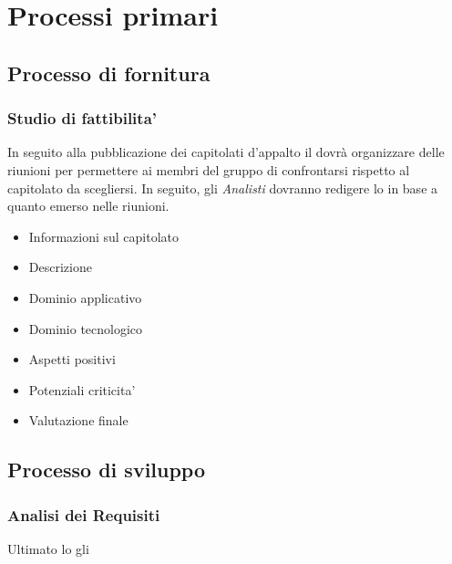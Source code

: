 \section{Processi primari}
\subsection{Processo di fornitura}

\subsubsection{Studio di fattibilita'}
In seguito alla pubblicazione dei capitolati d'appalto il \emph{\RdP} dovrà organizzare delle riunioni per permettere ai membri del gruppo di confrontarsi rispetto al capitolato da scegliersi.
In seguito, gli \emph{Analisti} dovranno redigere lo \emph{\SdF} in base a quanto emerso nelle riunioni.
\begin{itemize}
	\item 
	Informazioni sul capitolato
	\item 
	Descrizione
	\item 
	Dominio applicativo
	\item
	Dominio tecnologico
	\item
	Aspetti positivi
	\item 
	Potenziali criticita'
	\item 
	Valutazione finale
\end{itemize}

\subsection{Processo di sviluppo}
\subsubsection{Analisi dei Requisiti}
Ultimato lo \emph{\SdF} gli 